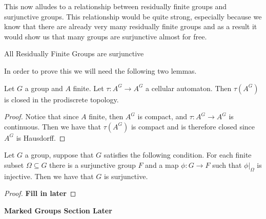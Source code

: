 This now alludes to a relationship between residually finite groups and 
surjunctive groups. This relationship would be quite strong, especially because 
we know that there are already very many residually finite groups and as a result 
it would show us that many groups are surjunctive almost for free.

\begin{thm}
  All Residually Finite Groups are surjunctive
\end{thm}

In order to prove this we will need the following two lemmas.

\begin{lemma}
  Let $G$ a group and $A$ finite. Let $\tau: A^{G} \to A^{G}$ a cellular
  automaton. Then $\tau(A^{G})$ is closed in the prodiscrete topology.
\end{lemma}
\begin{proof}
  Notice that since $A$ finite, then $A^{G}$ is compact, and $\tau: A^{G} \to
  A^{G}$ is continuous. Then we have that $\tau(A^{G})$ is compact and is
  therefore closed since $A^{G}$ is Hausdorff.
\end{proof}

\begin{lemma}
  Let $G$ a group, suppose that $G$ satisfies the following condition. For each
  finite subset $\Omega \subseteq G$ there is a surjunctive group $F$ and a map
  $\phi: G \to F$ such that $\phi|_{\Omega}$ is injective. Then we have that
  $G$ is surjunctive.
\end{lemma}
\begin{proof}
  \textbf{Fill in later}
\end{proof}


\textbf{Marked Groups Section Later}
